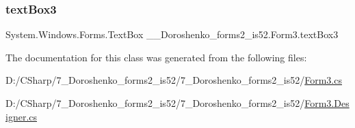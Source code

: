 \hypertarget{class__7___doroshenko__forms2__is52_1_1_form3_a66deab25b9348663a1c13b0a3cafc3b8}{}\label{class__7___doroshenko__forms2__is52_1_1_form3_a66deab25b9348663a1c13b0a3cafc3b8} 
\subsubsection{\texorpdfstring{text\+Box3}{textBox3}}
{\footnotesize\ttfamily System.\+Windows.\+Forms.\+Text\+Box \+\_\+\_\+\+Doroshenko\+\_\+forms2\+\_\+is52.\+Form3.\+text\+Box3\hspace{0.3cm}{\ttfamily [package]}}



The documentation for this class was generated from the following files\+:\begin{DoxyCompactItemize}
\item 
D\+:/\+C\+Sharp/7\+\_\+\+Doroshenko\+\_\+forms2\+\_\+is52/7\+\_\+\+Doroshenko\+\_\+forms2\+\_\+is52/\hyperlink{_form3_8cs}{Form3.\+cs}\item 
D\+:/\+C\+Sharp/7\+\_\+\+Doroshenko\+\_\+forms2\+\_\+is52/7\+\_\+\+Doroshenko\+\_\+forms2\+\_\+is52/\hyperlink{_form3_8_designer_8cs}{Form3.\+Designer.\+cs}\end{DoxyCompactItemize}
